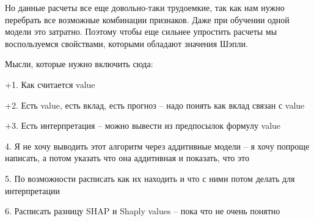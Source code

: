 Но данные расчеты все еще довольно-таки трудоемкие, так как нам нужно перебрать все возможные комбинации признаков. Даже при обучении одной модели это затратно. Поэтому чтобы еще сильнее упростить расчеты мы воспользуемся свойствами, которыми обладают значения Шэпли. %

Мысли, которые нужно включить сюда:

+1. Как считается value

+2. Есть value, есть вклад, есть прогноз -- надо понять как вклад связан с value

+3. Есть интерпретация -- можно вывести из предпосылок формулу value

4. Я не хочу выводить этот алгоритм через аддитивные модели -- я хочу попроще написать, а потом указать что она аддитивная и показать, что это

5. По возможности расписать как их находить и что с ними потом делать для интерпретации

6. Расписать разницу SHAP и Shaply values -- пока что не очень понятно

